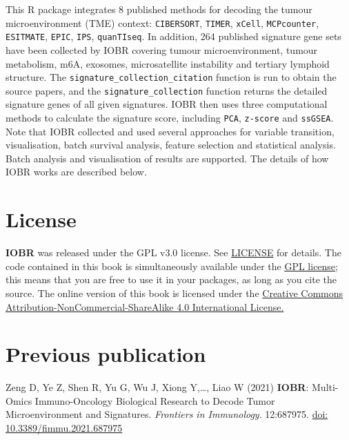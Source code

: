\documentclass[
  12pt,
]{book}
\begin{document}
This R package integrates 8 published methods for decoding the tumour microenvironment (TME) context: \texttt{CIBERSORT}, \texttt{TIMER}, \texttt{xCell}, \texttt{MCPcounter}, \texttt{ESITMATE}, \texttt{EPIC}, \texttt{IPS}, \texttt{quanTIseq}. In addition, 264 published signature gene sets have been collected by IOBR covering tumour microenvironment, tumour metabolism, m6A, exosomes, microsatellite instability and tertiary lymphoid structure. The \texttt{signature\_collection\_citation} function is run to obtain the source papers, and the \texttt{signature\_collection} function returns the detailed signature genes of all given signatures. IOBR then uses three computational methods to calculate the signature score, including \texttt{PCA}, \texttt{z-score} and \texttt{ssGSEA}. Note that IOBR collected and used several approaches for variable transition, visualisation, batch survival analysis, feature selection and statistical analysis. Batch analysis and visualisation of results are supported. The details of how IOBR works are described below.

\hypertarget{license}{%
\section{License}\label{license}}

\textbf{IOBR} was released under the GPL v3.0 license. See \href{https://github.com/IOBR/IOBR/blob/master/LICENSE}{LICENSE} for details. The code contained in this book is simultaneously available under the \href{https://www.gnu.org/licenses/why-not-lgpl.html}{GPL license}; this means that you are free to use it in your packages, as long as you cite the source. The online version of this book is licensed under the \href{https://creativecommons.org/licenses/by-nc-sa/4.0/}{Creative Commons Attribution-NonCommercial-ShareAlike 4.0 International License.}

\hypertarget{previous-publication}{%
\section{Previous publication}\label{previous-publication}}

Zeng D, Ye Z, Shen R, Yu G, Wu J, Xiong Y,\ldots, Liao W (2021) \textbf{IOBR}: Multi-Omics Immuno-Oncology Biological Research to Decode Tumor Microenvironment and Signatures. \emph{Frontiers in Immunology}. 12:687975. \href{https://www.frontiersin.org/articles/10.3389/fimmu.2021.687975/full}{doi: 10.3389/fimmu.2021.687975}
\end{document}

